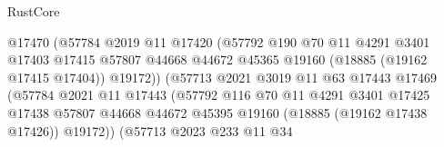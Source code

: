 \begin{lexlean}{RustCore}
\begin{coremodule}
                                        @17470
                                        (@57784
                                          @2019
                                          @11
                                          @17420
                                          (@57792
                                            @190
                                            @70
                                            @11
                                            @4291
                                            @3401
                                            @17403
                                            @17415
                                            @57807
                                            @44668
                                            @44672
                                            @45365
                                            @19160
                                            (@18885 (@19162 @17415 @17404))
                                            @19172))
                                        (@57713
                                          @2021
                                          @3019
                                          @11
                                          @63
                                          @17443
                                          @17469
                                          (@57784
                                            @2021
                                            @11
                                            @17443
                                            (@57792
                                              @116
                                              @70
                                              @11
                                              @4291
                                              @3401
                                              @17425
                                              @17438
                                              @57807
                                              @44668
                                              @44672
                                              @45395
                                              @19160
                                              (@18885 (@19162 @17438 @17426))
                                              @19172))
                                          (@57713
                                            @2023
                                            @233
                                            @11
                                            @34

\end{coremodule}
\end{lexlean}
